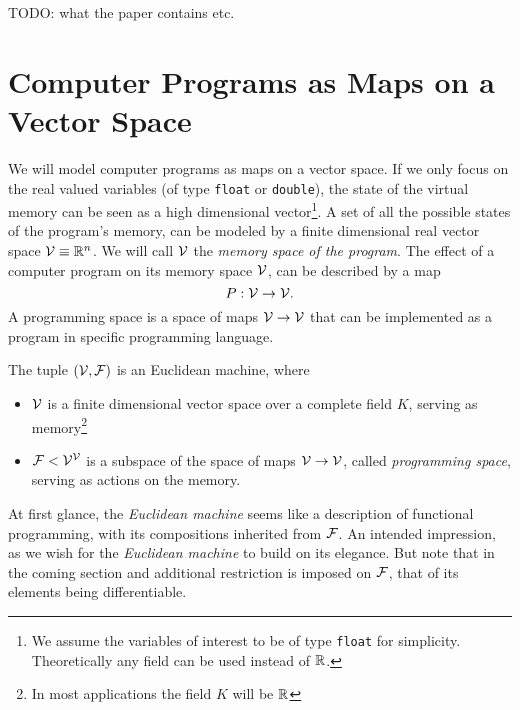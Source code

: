 TODO: what the paper contains etc.

\section{Computer Programs as Maps on a Vector Space}

We will model computer programs as maps on a vector space. If
we only focus on the real valued variables (of type \texttt{float} or
\texttt{double}), the state of the virtual memory can be seen as a high
dimensional vector\footnote{We assume the variables of interest to be of type \texttt{float} for
  simplicity. Theoretically any field can be used instead of $\mathbb{R}$.}. 
A set of all the possible states of the program's memory,
can be modeled by a finite dimensional real vector space $\mathcal{V}\equiv \mathbb{R}^n$. We
will call $\mathcal{V}$ the \emph{memory space of the program}. The effect of a computer
program on its memory space $\mathcal{V}$, can be described by a map
\begin{equation}
  \label{eq:map}
  P:\mathcal{V}\to \mathcal{V}.
\end{equation}
A programming space is a space of maps $\mathcal{V}\to\mathcal{V}$ that can be implemented as a
program in specific programming language. 
\begin{definition} The tuple $(\mathcal{V},\mathcal{F})$ is an Euclidean machine, where
  \begin{itemize}
  \item
  $\mathcal{V}$ is a finite dimensional vector space over a complete field $K$, serving
  as memory\footnote{In most applications the field $K$ will
    be $\mathbb{R}$}
  \item
  $\mathcal{F}< \mathcal{V}^{\mathcal{V}}$ is a subspace of the space of maps $\mathcal{V}\to \mathcal{V}$, called \emph{programming space}, serving as actions on the memory.
  \end{itemize}  
\end{definition}

At first glance, the \emph{Euclidean machine} seems like a description of functional programming, with its compositions inherited from $\mathcal{F}$. An intended impression, as we wish for the \emph{Euclidean machine} to build on its elegance. But note that in the coming section and additional restriction is imposed on $\mathcal{F}$, that of its elements being differentiable.

\printbibliography

